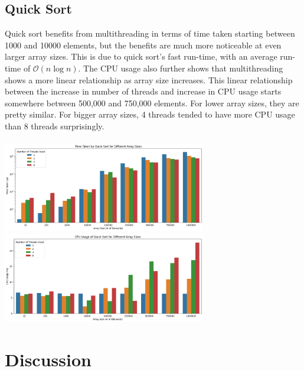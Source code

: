 \documentclass[conference]{IEEEtran}
\begin{document}
\subsection{Quick Sort}
Quick sort benefits from multithreading in terms of time taken starting between 1000 and 10000 elements, but the benefits are much more noticeable at even larger array sizes. This is due to quick sort's fast run-time, with an average run-time of $\mathcal{O}(n\log{}n)$. The CPU usage also further shows that multithreading shows a more linear relationship as array size increases. This linear relationship between the increase in number of threads and increase in CPU usage starts somewhere between 500,000 and 750,000 elements. For lower array sizes, they are pretty similar. For bigger array sizes, 4 threads tended to have more CPU usage than 8 threads surprisingly.
\\\\
\includegraphics[width=3.5in]{QuickSortTimeTaken.png}
\includegraphics[width=3.5in]{QuickSortCPUUsage.png}

\section{Discussion}
\end{document}
